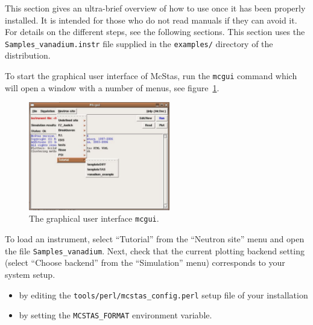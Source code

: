 This section gives an ultra-brief overview of how to use \MCS once it
has been properly installed. It is intended for those who do not read
manuals if they can avoid it. For details on the different steps, see
the following sections. This section uses the
\verb+Samples_vanadium.instr+ file supplied in the \verb+examples/+
directory of the \MCS distribution. %

To start the graphical user interface of McStas, run the
\verb+mcgui+ command which will open a window
with a number of menus,
see figure~\ref{fig:mcgui}. 
\begin{figure}[htb!]
  \begin{center}
    \includegraphics[width=0.55\textwidth]{figures/mcgui}
  \end{center}
\caption{The graphical user interface \texttt{mcgui}.}
\label{fig:mcgui}
\end{figure}
\label{p:neutronsite}
To load an instrument, select ``Tutorial'' from the ``Neutron site''
menu and open the file \verb+Samples_vanadium+. Next, check that the current plotting backend setting
(select ``Choose backend'' from the ``Simulation'' menu) corresponds
to your system setup.
\begin{itemize}
\item{by editing
the \verb+tools/perl/mcstas_config.perl+ setup file of your
installation}
\item{by setting the \verb+MCSTAS_FORMAT+ environment
variable.}
\end{itemize}


